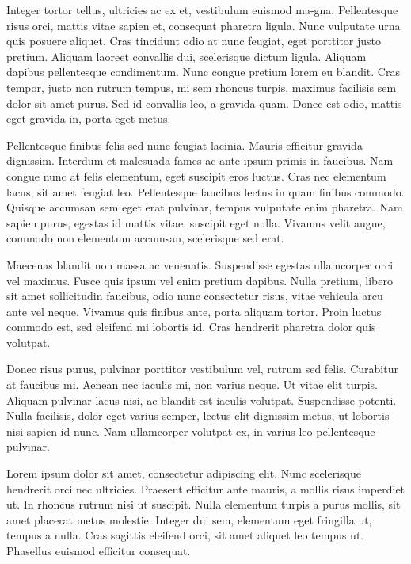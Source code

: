 Integer tortor tellus, ultricies ac ex et, vestibulum euismod ma-gna. Pellentesque risus orci, mattis vitae sapien et, consequat pharetra ligula. Nunc vulputate urna quis posuere aliquet. Cras tincidunt odio at nunc feugiat, eget porttitor justo pretium. Aliquam laoreet convallis dui, scelerisque dictum ligula. Aliquam dapibus pellentesque condimentum. Nunc congue pretium lorem eu blandit. Cras tempor, justo non rutrum tempus, mi sem rhoncus turpis, maximus facilisis sem dolor sit amet purus. Sed id convallis leo, a gravida quam. Donec est odio, mattis eget gravida in, porta eget metus.

Pellentesque finibus felis sed nunc feugiat lacinia. Mauris efficitur gravida dignissim. Interdum et malesuada fames ac ante ipsum primis in faucibus. Nam congue nunc at felis elementum, eget suscipit eros luctus. Cras nec elementum lacus, sit amet feugiat leo. Pellentesque faucibus lectus in quam finibus commodo. Quisque accumsan sem eget erat pulvinar, tempus vulputate enim pharetra. Nam sapien purus, egestas id mattis vitae, suscipit eget nulla. Vivamus velit augue, commodo non elementum accumsan, scelerisque sed erat.

Maecenas blandit non massa ac venenatis. Suspendisse egestas ullamcorper orci vel maximus. Fusce quis ipsum vel enim pretium dapibus. Nulla pretium, libero sit amet sollicitudin faucibus, odio nunc consectetur risus, vitae vehicula arcu ante vel neque. Vivamus quis finibus ante, porta aliquam tortor. Proin luctus commodo est, sed eleifend mi lobortis id. Cras hendrerit pharetra dolor quis volutpat.

Donec risus purus, pulvinar porttitor vestibulum vel, rutrum sed felis. Curabitur at faucibus mi. Aenean nec iaculis mi, non varius neque. Ut vitae elit turpis. Aliquam pulvinar lacus nisi, ac blandit est iaculis volutpat. Suspendisse potenti. Nulla facilisis, dolor eget varius semper, lectus elit dignissim metus, ut lobortis nisi sapien id nunc. Nam ullamcorper volutpat ex, in varius leo pellentesque pulvinar.

Lorem ipsum dolor sit amet, consectetur adipiscing elit. Nunc scelerisque hendrerit orci nec ultricies. Praesent efficitur ante mauris, a mollis risus imperdiet ut. In rhoncus rutrum nisi ut suscipit. Nulla elementum turpis a purus mollis, sit amet placerat metus molestie. Integer dui sem, elementum eget fringilla ut, tempus a nulla. Cras sagittis eleifend orci, sit amet aliquet leo tempus ut. Phasellus euismod efficitur consequat.

